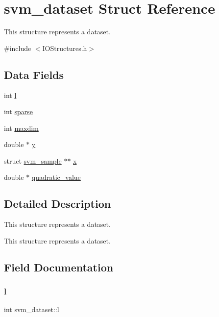 \hypertarget{structsvm__dataset}{}\section{svm\+\_\+dataset Struct Reference}
\label{structsvm__dataset}


This structure represents a dataset.  




{\ttfamily \#include $<$I\+O\+Structures.\+h$>$}

\subsection*{Data Fields}
\begin{DoxyCompactItemize}
\item 
int \hyperlink{structsvm__dataset_a899bdc43cdfb5e7063e8d7d1787357b4}{l}
\item 
int \hyperlink{structsvm__dataset_a58e8012a38ef5ea1c642db1b8c06b8bc}{sparse}
\item 
int \hyperlink{structsvm__dataset_aec1d1ee62ef8204fe90d8c6b7a647177}{maxdim}
\item 
double $\ast$ \hyperlink{structsvm__dataset_a2bce5da2f59f28fe18eff3f92f92c011}{y}
\item 
struct \hyperlink{structsvm__sample}{svm\+\_\+sample} $\ast$$\ast$ \hyperlink{structsvm__dataset_ad3e266a07c610ed3f10df1bab30fd9e5}{x}
\item 
double $\ast$ \hyperlink{structsvm__dataset_a4b1ff8b06358c73f6b55ecae7516d01e}{quadratic\+\_\+value}
\end{DoxyCompactItemize}


\subsection{Detailed Description}
This structure represents a dataset. 

This structure represents a dataset. 

\subsection{Field Documentation}
\hypertarget{structsvm__dataset_a899bdc43cdfb5e7063e8d7d1787357b4}{}\label{structsvm__dataset_a899bdc43cdfb5e7063e8d7d1787357b4} 
\subsubsection{\texorpdfstring{l}{l}}
{\ttfamily int svm\+\_\+dataset\+::l}

